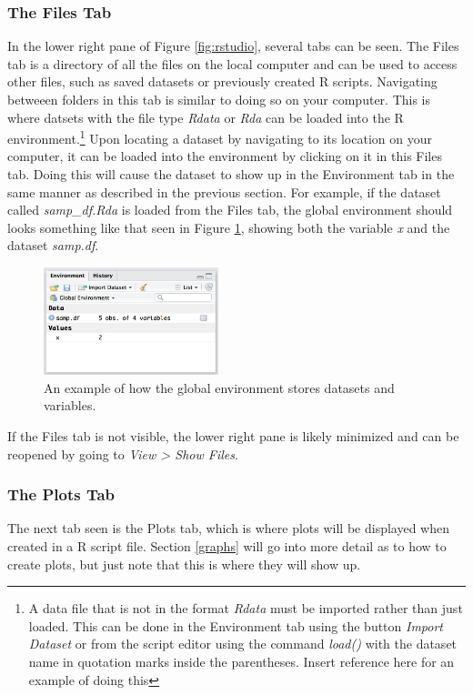 \documentclass{report}\usepackage[]{graphicx}\usepackage[]{color}
\begin{document}
\subsubsection{The Files Tab}
In the lower right pane of Figure \ref{fig:rstudio}, several tabs can be seen.  The Files tab is a directory of all the files on the local computer and can be used to access other files, such as saved datasets or previously created \textsf{R} scripts.  Navigating betweeen folders in this tab is similar to doing so on your computer.  This is where datsets with the file type \textit{Rdata} or \textit{Rda} can be loaded into the \textsf{R} environment.\footnote{A data file that is not in the format \textit{Rdata} must be imported rather than just loaded.  This can be done in the Environment tab using the button \textit{Import Dataset} or from the script editor using the command \textit{load()} with the dataset name in quotation marks inside the parentheses.  Insert reference here for an example of doing this}   Upon locating a dataset by navigating to its location on your computer, it can be loaded into the environment by clicking on it in this Files tab.  Doing this will cause the dataset to show up in the Environment tab in the same manner as described in the previous section.  For example, if the dataset called \textit{samp\_df.Rda} is loaded from the Files tab, the global environment should looks something like that seen in Figure \ref{fig:rstudioenv}, showing both the variable \textit{x} and the dataset \textit{samp.df}.   

\begin{figure}[h!]
\centering
\includegraphics[width = 2in]{chapters/chapter_0/rstudioenv.png}
\caption{An example of how the global environment stores datasets and variables.}
\label{fig:rstudioenv}
\end{figure}

If the Files tab is not visible, the lower right pane is likely minimized and can be reopened by going to \textit{View > Show Files}.


\subsubsection{The Plots Tab} 
The next tab seen is the Plots tab, which is where plots will be displayed when created in a R script file.  Section \ref{graphs} will go into more detail as to how to create plots, but just note that this is where they will show up.  
\end{document}
